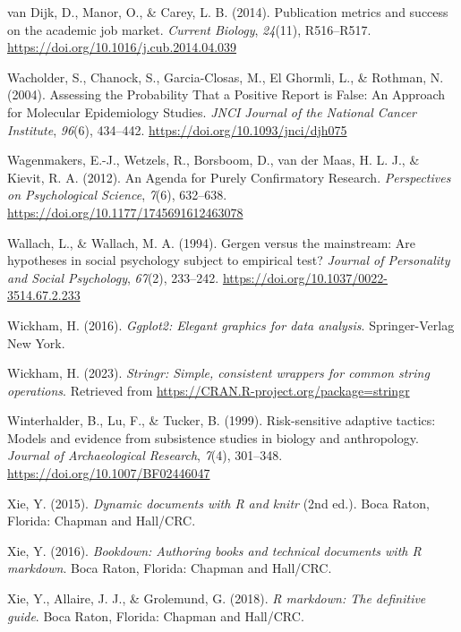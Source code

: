 \documentclass[
  british,
  a4paper,
  ,man,floatsintext]{apa6}
\newlength{\cslhangindent}
\newenvironment{CSLReferences}[2] %
 {\begin{list}{}{%
  \setlength{\itemindent}{0pt}
  \setlength{\leftmargin}{0pt}
  \setlength{\parsep}{0pt}
  \ifodd #1
   \setlength{\leftmargin}{\cslhangindent}
   \setlength{\itemindent}{-1\cslhangindent}
  \fi
  \setlength{\itemsep}{#2\baselineskip}}}
 {\end{list}}
\begin{document}
\begin{CSLReferences}{1}{0}
van Dijk, D., Manor, O., \& Carey, L. B. (2014). Publication metrics and success on the academic job market. \emph{Current Biology}, \emph{24}(11), R516--R517. \url{https://doi.org/10.1016/j.cub.2014.04.039}

Wacholder, S., Chanock, S., Garcia-Closas, M., El Ghormli, L., \& Rothman, N. (2004). Assessing the {Probability That} a {Positive Report} is {False}: {An Approach} for {Molecular Epidemiology Studies}. \emph{JNCI Journal of the National Cancer Institute}, \emph{96}(6), 434--442. \url{https://doi.org/10.1093/jnci/djh075}

Wagenmakers, E.-J., Wetzels, R., Borsboom, D., van der Maas, H. L. J., \& Kievit, R. A. (2012). An {Agenda} for {Purely Confirmatory Research}. \emph{Perspectives on Psychological Science}, \emph{7}(6), 632--638. \url{https://doi.org/10.1177/1745691612463078}

Wallach, L., \& Wallach, M. A. (1994). Gergen versus the mainstream: {Are} hypotheses in social psychology subject to empirical test? \emph{Journal of Personality and Social Psychology}, \emph{67}(2), 233--242. \url{https://doi.org/10.1037/0022-3514.67.2.233}

Wickham, H. (2016). \emph{Ggplot2: {Elegant} graphics for data analysis}. Springer-Verlag New York.

Wickham, H. (2023). \emph{Stringr: Simple, consistent wrappers for common string operations}. Retrieved from \url{https://CRAN.R-project.org/package=stringr}

Winterhalder, B., Lu, F., \& Tucker, B. (1999). Risk-sensitive adaptive tactics: {Models} and evidence from subsistence studies in biology and anthropology. \emph{Journal of Archaeological Research}, \emph{7}(4), 301--348. \url{https://doi.org/10.1007/BF02446047}

Xie, Y. (2015). \emph{Dynamic documents with {R} and knitr} (2nd ed.). Boca Raton, Florida: {Chapman and Hall/CRC}.

Xie, Y. (2016). \emph{Bookdown: {Authoring} books and technical documents with {R} markdown}. Boca Raton, Florida: {Chapman and Hall/CRC}.

Xie, Y., Allaire, J. J., \& Grolemund, G. (2018). \emph{R markdown: {The} definitive guide}. Boca Raton, Florida: {Chapman and Hall/CRC}.

\end{CSLReferences}
\end{document}
